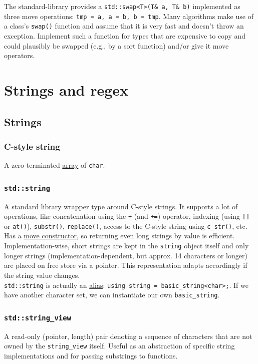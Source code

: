\documentclass[table, xcdraw]{article}%
\begin{document}
The standard-library provides a \texttt{std::swap<T>(T& a, T& b)} implemented as three move operations: \texttt{tmp = a, a = b, b = tmp}. Many algorithms make use of a class's \texttt{swap()} function and assume that it is very fast and doesn’t throw an exception. Implement such a function for types that are expensive to copy and could plausibly be swapped (e.g., by a sort function) and/or give it move operators.

\section{Strings and regex}

\subsection{Strings}

\subsubsection{C-style string}
A zero-terminated \hyperref[array]{array} of \texttt{char}.

\subsubsection{\texttt{std::string}} \label{string}
A standard library wrapper type around C-style strings. It supports a lot of operations, like concatenation using the \texttt{+} (and \texttt{+=}) operator, indexing (using \texttt{[]} or \texttt{at()}), \texttt{substr()}, \texttt{replace()}, access to the C-style string using \texttt{c_str()}, etc. Has a \hyperref[moveconstructor]{move constructor}, so returning even long strings by value is efficient.\\
Implementation-wise, short strings are kept in the \texttt{string} object itself and only longer strings (implementation-dependent, but approx. 14 characters or longer) are placed on free store via a pointer. This representation adapts accordingly if the string value changes.\\
\texttt{std::string} is actually an \hyperref[alias]{alias}: \texttt{using string = basic_string<char>;}. If we have another character set, we can instantiate our own \texttt{basic_string}.

\subsubsection{\texttt{std::string_view}} \label{string_view}
A read-only (pointer, length) pair denoting a sequence of characters that are not owned by the \texttt{string_view} itself. Useful as an abstraction of specific string implementations and for passing substrings to functions.
\end{document}
